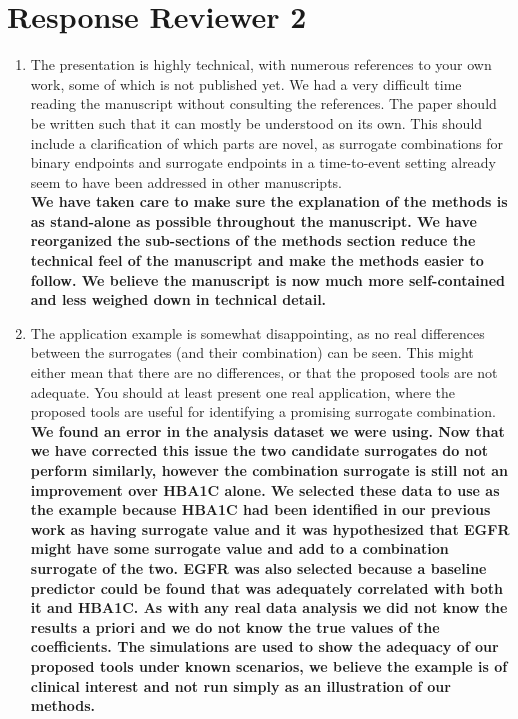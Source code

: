 \documentclass[11pt]{article} %
\begin{document}
\section{Response Reviewer 2}
\begin{enumerate}
\item The presentation is highly technical, with numerous references to your own work, some of which is not published yet. We had a very difficult time reading the manuscript without consulting the references. The paper should be written such that it can mostly be understood on its own. This should include a clarification of which parts are novel, as surrogate combinations for binary endpoints and surrogate endpoints in a time-to-event setting already seem to have been addressed in other manuscripts.\\
 \textbf{We have taken care to make sure the explanation of the methods is as stand-alone as possible throughout the manuscript. We have reorganized the sub-sections of the methods section reduce the technical feel of the manuscript and make the methods easier to follow. We believe the manuscript is now much more self-contained and less weighed down in technical detail.}
 
\item The application example is somewhat disappointing, as no real differences between the surrogates (and their combination) can be seen. This might either mean that there are no differences, or that the proposed tools are not adequate. You should at least present one real application, where the proposed tools are useful for identifying a promising surrogate combination.\\
\textbf{We found an error in the analysis dataset we were using. Now that we have corrected this issue the two candidate surrogates do not perform similarly, however the combination surrogate is still not an improvement over HBA1C alone. We selected these data to use as the example because HBA1C had been identified in our previous work as having surrogate value and it was hypothesized that EGFR might have some surrogate value and add to a combination surrogate of the two. EGFR was also selected because a baseline predictor could be found that was adequately correlated with both it and HBA1C. As with any real data analysis we did not know the results a priori and we do not know the true values of the coefficients. The simulations are used to show the adequacy of our proposed tools under known scenarios, we believe the example is of clinical interest and not run simply as an illustration of our methods.}


\end{enumerate}
\end{document}
